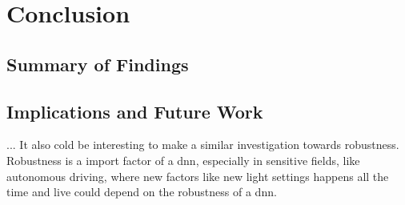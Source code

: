 \chapter{Conclusion}
\label{chap:kapitel6}



	\section{Summary of Findings}
	\label{sec:summary-of-findings}
	
	
	
	\section{Implications and Future Work}
	\label{sec:implications-and-future-work}
		...
		It also cold be interesting to make a similar investigation towards robustness. Robustness is a import factor of a \ac{dnn}, especially in sensitive fields, like autonomous driving, where new factors like new light settings happens all the time and live could depend on the robustness of a \ac{dnn}. 
	
	
	
	
	
	
	


